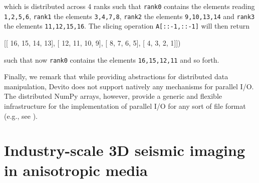 \documentclass[conference]{IEEEtran}
\newenvironment{Shaded}{}{}
\newcommand{\DecValTok}[1]{\textcolor[rgb]{0.25,0.63,0.44}{{#1}}}
\newcommand{\NormalTok}[1]{{#1}}
\begin{document}
which is distributed across 4 ranks such that \texttt{rank\phantom{\ }0}
contains the elements reading
\texttt{1,\phantom{\ }2,\phantom{\ }5,\phantom{\ }6},
\texttt{rank\phantom{\ }1} the elements
\texttt{3,\phantom{\ }4,\phantom{\ }7,\phantom{\ }8},
\texttt{rank\phantom{\ }2} the elements
\texttt{9,\phantom{\ }10,\phantom{\ }13,\phantom{\ }14} and
\texttt{rank\phantom{\ }3} the elements
\texttt{11,\phantom{\ }12,\phantom{\ }15,\phantom{\ }16}. The slicing
operation \texttt{A{[}::-1,\phantom{\ }::-1{]}} will then return

\begin{Shaded}
\begin{Highlighting}[]
    \NormalTok{[[ }\DecValTok{16}\NormalTok{, }\DecValTok{15}\NormalTok{, }\DecValTok{14}\NormalTok{, }\DecValTok{13}\NormalTok{],}
     \NormalTok{[ }\DecValTok{12}\NormalTok{, }\DecValTok{11}\NormalTok{, }\DecValTok{10}\NormalTok{,  }\DecValTok{9}\NormalTok{],}
     \NormalTok{[  }\DecValTok{8}\NormalTok{,  }\DecValTok{7}\NormalTok{,  }\DecValTok{6}\NormalTok{,  }\DecValTok{5}\NormalTok{],}
     \NormalTok{[  }\DecValTok{4}\NormalTok{,  }\DecValTok{3}\NormalTok{,  }\DecValTok{2}\NormalTok{,  }\DecValTok{1}\NormalTok{]])}
\end{Highlighting}
\end{Shaded}

such that now \texttt{rank\phantom{\ }0} contains the elements
\texttt{16,\phantom{\ }15,\phantom{\ }12,\phantom{\ }11} and so forth.

Finally, we remark that while providing abstractions for distributed
data manipulation, Devito
does not support natively any mechanisms for parallel I/O. The
distributed NumPy arrays, however, provide a generic and flexible
infrastructure for the implementation of parallel I/O for any sort of
file format (e.g., see \cite{witte2018alf}).

\section{Industry-scale 3D seismic imaging in anisotropic
media}\label{industry-scale-3d-seismic-imaging-in-anisotropic-media}
\end{document}
